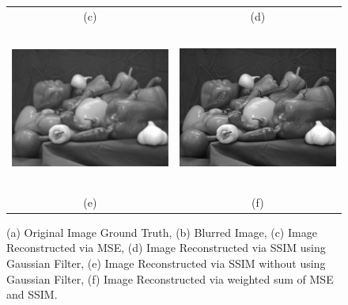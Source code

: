 \documentclass[a4paper, 15pt]{article}
\begin{document}
\begin{figure}[!h]
\begin{tabular}{cc}
			(c) & (d) \\ 
			\includegraphics[width=7cm, height=5.3cm]{SSIM_Reconstruction_Simple.jpg} &\hspace{-8pt}
			\includegraphics[width=7cm, height=5.3cm]{ssimL2Rec.jpg}\\
			(e) & (f) \\
		\end{tabular}
		\caption{(a) Original Image Ground Truth, (b) Blurred Image, (c) Image Reconstructed via MSE, (d) Image Reconstructed via SSIM using Gaussian Filter, (e) Image Reconstructed via SSIM without using Gaussian Filter, (f) Image Reconstructed via weighted sum of MSE and SSIM.}
	\end{figure}
\end{document}
